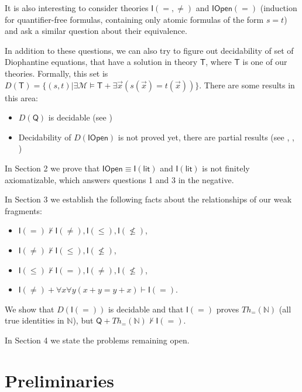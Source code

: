 \documentclass[a4paper,14pt]{article}
\theoremstyle{definition}
\theoremstyle{theorem}
\theoremstyle{lemma}
\theoremstyle{proposition}
\theoremstyle{remark}
\theoremstyle{corollary}
\theoremstyle{problem}
\theoremstyle{hypothesis}
\begin{document}
It is also interesting to consider theories $\mathsf{I(=, \ne)}$ and $\mathsf{IOpen(=)}$ (induction for quantifier-free formulas, containing only atomic formulas of the form $s = t$) and ask a similar question about their equivalence. 

In addition to these questions, we can also try to figure out decidability of set of Diophantine equations, that have a solution in theory $\mathsf{T}$, where $\mathsf{T}$ is one of our theories. Formally, this set is $D(\mathsf{T}) = \{(s, t) | \exists \mathcal M \vDash \mathsf{T} + \exists \vec{x} (s(\vec x) = t(\vec x))\}$. There are some results in this area:
\begin{itemize}
    \item $D(\mathsf Q)$ is decidable (see \cite{jerabek2016})
    \item Decidability of $D(\mathsf{IOpen})$ is not proved yet, there are partial results (see \cite{wilkie1978}, \cite{van_den_dries1980}, \cite{otero1990})
\end{itemize}

In Section 2 we prove that $\mathsf{IOpen} \equiv \mathsf{I(lit)}$ and $\mathsf{I(lit)}$ is not finitely axiomatizable, which answers questions 1 and 3 in the negative. 

In Section 3 we establish the following facts about the relationships of our weak fragments:

\begin{itemize}
    \item $\mathsf I(=) \nvdash \mathsf I(\ne), \mathsf I (\leqslant), \mathsf I(\nleqslant)$,
    \item $\mathsf I(\ne) \nvdash \mathsf I(\leqslant), \mathsf I(\nleqslant)$,
    \item $\mathsf I(\leqslant) \nvdash \mathsf I(=), \mathsf I(\ne), \mathsf I(\nleqslant)$,
    \item $\mathsf I(\ne) + \forall x \forall y (x + y = y + x) \vdash \mathsf I(=)$.
\end{itemize}

We show that $D(\mathsf{I(=)})$ is decidable and that $\mathsf{I(=)}$ proves $Th_=(\mathbb N)$ (all true identities in $\mathbb N$), but $\mathsf Q + Th_=(\mathbb N) \nvdash \mathsf{I(=)}$.

In Section 4 we state the problems remaining open.

\section{Preliminaries}
\end{document}

